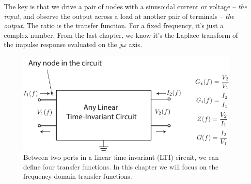 The key is that we drive a pair of nodes with a sinusoidal current or voltage -- \textit{the input}, and observe the output across a load at another pair of terminals -- \textit{the output}.  The ratio is the transfer function.  For a fixed frequency, it’s just a complex number.  From the last chapter, we know it's the  Laplace transform of the impulse response evaluated on the $j\omega$ axis.
\begin{figure}[tb]
\centering
\includegraphics[scale=1]{transfer_func}
\caption{Between two ports in a linear time-invariant (LTI) circuit, we can define four transfer functions.  In this chapter we will focus on the frequency domain transfer functions.}
\label{fig:blackboxltiports}
\end{figure}
